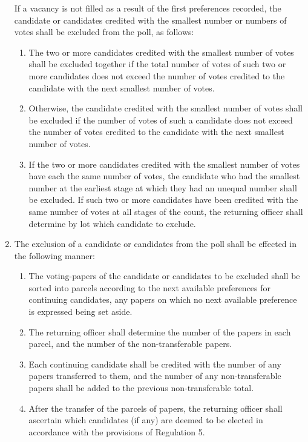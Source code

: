 \documentclass{article}
\begin{document}
\begin{enumerate}
If a vacancy is not filled as a result of the first preferences recorded, the
candidate or candidates credited with the smallest number or numbers of
votes shall be excluded from the poll, as follows:
  \begin{enumerate}
  \item The two or more candidates credited with the smallest number of
  votes shall be excluded together if the total number of votes of such
  two or more candidates does not exceed the number of votes credited
  to the candidate with the next smallest number of votes.
  \item Otherwise, the candidate credited with the smallest number of votes
  shall be excluded if the number of votes of such a candidate does not
  exceed the number of votes credited to the candidate with the next
  smallest number of votes.
  \item If the two or more candidates credited with the smallest number of
  votes have each the same number of votes, the candidate who had the
  smallest number at the earliest stage at which they had an unequal
  number shall be excluded. If such two or more candidates have been
  credited with the same number of votes at all stages of the count, the
  returning officer shall determine by lot which candidate to exclude.
  \end{enumerate}
\item The exclusion of a candidate or candidates from the poll shall be effected
in the following manner:
  \begin{enumerate}
  \item The voting-papers of the candidate or candidates to be excluded shall
  be sorted into parcels according to the next available preferences
  for continuing candidates, any papers on which no next available
  preference is expressed being set aside.
  \item The returning officer shall determine the number of the papers in
  each parcel, and the number of the non-transferable papers.
  \item Each continuing candidate shall be credited with the number of
  any papers transferred to them, and the number of any non-transferable papers shall be added to the previous non-transferable
  total.
  \item After the transfer of the parcels of papers, the returning officer shall
  ascertain which candidates (if any) are deemed to be elected in accordance with the provisions of Regulation 5.
  \end{enumerate}

\end{enumerate}
\end{document}

